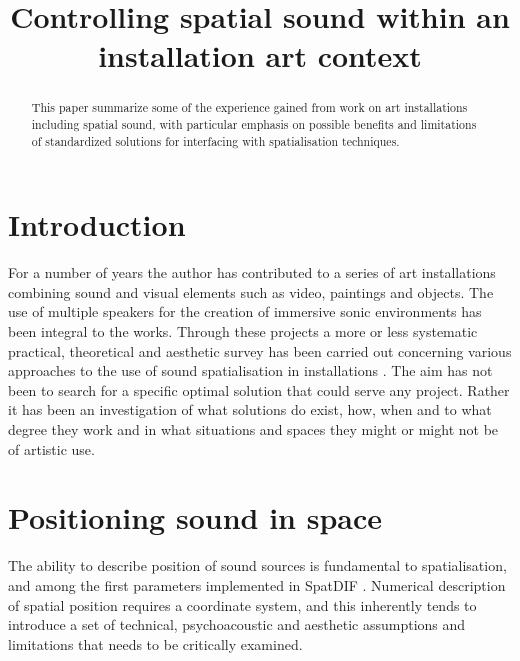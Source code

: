 \documentclass{article}
\title{Controlling spatial sound within an installation art context}
\begin{document}
%
\maketitle
%
\begin{abstract}

This paper summarize some of the experience gained from work on art installations including spatial sound, with particular emphasis on possible benefits and limitations of standardized solutions for interfacing with spatialisation techniques.

\end{abstract}
%

\section{Introduction}\label{sec:introduction} %

For a number of years the author has contributed to a series of art installations combining sound and visual elements such as video, paintings and objects. The use of multiple speakers for the creation of immersive sonic environments has been integral to the works. Through these projects a more or less systematic practical, theoretical and aesthetic survey has been carried out concerning various approaches to the use of sound spatialisation in installations \cite{lossius:2007sound_space_body}. The aim has not been to search for a specific optimal solution that could serve any project. Rather it has been an investigation of what solutions do exist, how, when and to what degree they work and in what situations and spaces they might or might not be of artistic use.



\section{Positioning sound in space}\label{sec:coordinate} %


The ability to describe position of sound sources is fundamental to spatialisation, and among the first parameters implemented in SpatDIF \cite{Peters:2008spatdif}. Numerical description of spatial position requires a coordinate system, and this inherently tends to introduce a set of technical, psychoacoustic and aesthetic assumptions and limitations that needs to be critically examined.
\end{document}
